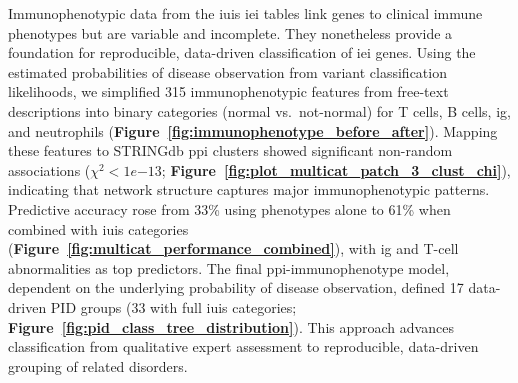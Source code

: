 Immunophenotypic data from the \ac{iuis} \ac{iei} tables link genes to clinical immune phenotypes but are variable and incomplete. They nonetheless provide a foundation for reproducible, data-driven classification of \ac{iei} genes. Using the estimated probabilities of disease observation from variant classification likelihoods, we simplified 315 immunophenotypic features from free-text descriptions into binary categories (normal vs.\ not-normal) for T cells, B cells, \ac{ig}, and neutrophils (\textbf{Figure~\ref{fig:immunophenotype_before_after}}). Mapping these features to STRINGdb \ac{ppi} clusters showed significant non-random associations ($\chi^2 < 1e{-13}$; \textbf{Figure~\ref{fig:plot_multicat_patch_3_clust_chi}}), indicating that network structure captures major immunophenotypic patterns. Predictive accuracy rose from 33\% using phenotypes alone to 61\% when combined with \ac{iuis} categories (\textbf{Figure~\ref{fig:multicat_performance_combined}}), with \ac{ig} and T-cell abnormalities as top predictors. The final \ac{ppi}-immunophenotype model, dependent on the underlying probability of disease observation, defined 17 data-driven PID groups (33 with full \ac{iuis} categories; \textbf{Figure~\ref{fig:pid_class_tree_distribution}}). This approach advances classification from qualitative expert assessment to reproducible, data-driven grouping of related disorders.





